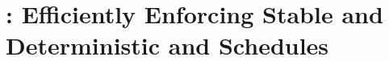 
\newcommand{\bddbddb}{\vv{bddbddb}\xspace}
\newcommand{\peregrinenprog}[0]{18\xspace}

\chapter{\peregrine: Efficiently Enforcing Stable and Deterministic and Schedules} \label{sec:peregrine}













